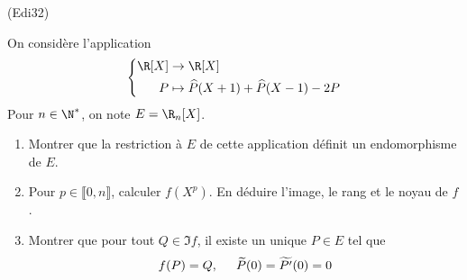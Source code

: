 \begin{tiny}(Edi32)\end{tiny} On considère l'application
\begin{displaymath}
\left\lbrace  
\begin{aligned}
  \R[X] &\rightarrow \R[X] \\ P &\mapsto \widehat{P}(X+1) + \widehat{P}(X-1) - 2P
\end{aligned}
\right. 
\end{displaymath}
Pour $n\in \N^*$, on note $E = \R_n[X]$.
\begin{enumerate}
  \item Montrer que la restriction à $E$ de cette application définit un endomorphisme de $E$.
  \item Pour $p\in \llbracket 0, n \rrbracket$, calculer $f(X^p)$. En déduire l'image, le rang et le noyau de $f$.
  \item Montrer que pour tout $Q\in \Im f$, il existe un unique $P\in E$ tel que
\begin{displaymath}
  f(P)= Q, \hspace{0.5cm} \widetilde{P}(0) = \widetilde{P'}(0) = 0
\end{displaymath}
\end{enumerate}
